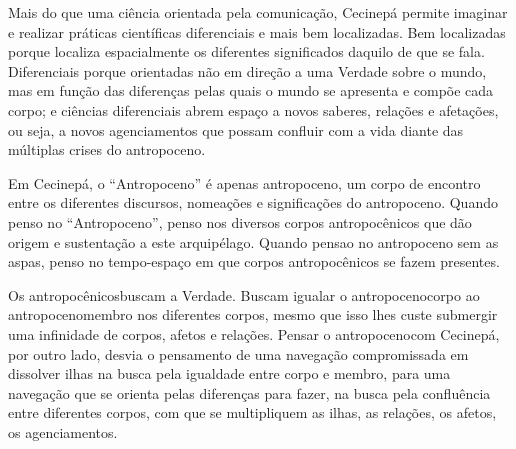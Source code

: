 Mais do que uma ciência orientada pela comunicação, Cecinepá permite imaginar e realizar práticas científicas diferenciais e mais bem localizadas. Bem localizadas porque localiza espacialmente os diferentes significados daquilo de que se fala. Diferenciais porque orientadas não em direção a uma Verdade sobre o mundo, mas em função das diferenças pelas quais o mundo se apresenta e compõe cada corpo; e ciências diferenciais abrem espaço a novos saberes, relações e afetações, ou seja, a novos agenciamentos que possam confluir com a vida diante das múltiplas crises do antropoceno.

Em Cecinepá, o \enquote{Antropoceno} é apenas \guillemetleft antropoceno\guillemetright, um corpo de encontro entre os diferentes discursos, nomeações e significações do antropoceno. Quando penso no \enquote{Antropoceno}, penso nos diversos corpos antropocênicos que dão origem e sustentação a este arquipélago. Quando pensao no antropoceno sem as aspas, penso no tempo-espaço em que corpos antropocênicos se fazem presentes.

Os \guillemetleft antropocênicos\guillemetright buscam a Verdade. Buscam igualar o \guillemetleft antropoceno\guillemetright corpo ao \guillemetleft antropoceno\guillemetright membro nos diferentes corpos, mesmo que isso lhes custe submergir uma infinidade de corpos, afetos e relações. Pensar o \guillemetleft antropoceno\guillemetright com Cecinepá, por outro lado, desvia o pensamento de uma navegação compromissada em dissolver ilhas na busca pela igualdade entre corpo e membro, para uma navegação que se orienta pelas diferenças para fazer, na busca pela confluência entre diferentes corpos, com que se multipliquem as ilhas, as relações, os afetos, os agenciamentos.
